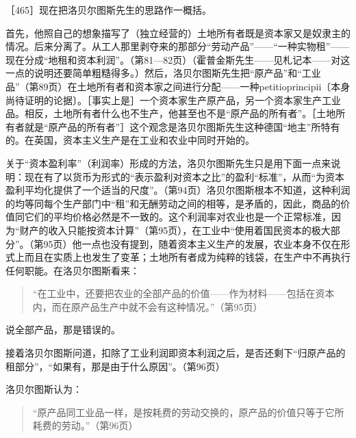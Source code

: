 
［465］现在把洛贝尔图斯先生的思路作一概括。

首先，他照自己的想象描写了（独立经营的）土地所有者既是资本家又是奴隶主的情况。后来分离了。从工人那里剥夺来的那部分“劳动产品”——“一种实物租”——现在分成“地租和资本利润”。（第81—82页）（霍普金斯先生——见札记本——对这一点的说明还要简单粗糙得多。）然后，洛贝尔图斯先生把“原产品”和“工业品”（第89页）在土地所有者和资本家之间进行分配——一种petitioprincipii〔本身尚待证明的论据〕。［事实上是］一个资本家生产原产品，另一个资本家生产工业品。相反，土地所有者什么也不生产，他甚至也不是“原产品的所有者”。［土地所有者就是“原产品的所有者”］这个观念是洛贝尔图斯先生这种德国“地主”所特有的。在英国，资本主义生产是在工业和农业中同时开始的。

关于“资本盈利率”（利润率）形成的方法，洛贝尔图斯先生只是用下面一点来说明：现在有了以货币为形式的“表示盈利对资本之比”的盈利“标准”，从而“为资本盈利平均化提供了一个适当的尺度”。（第94页）洛贝尔图斯根本不知道，这种利润的均等同每个生产部门中“租”和无酬劳动之间的相等，是矛盾的，因此，商品的价值同它们的平均价格必然是不一致的。这个利润率对农业也是一个正常标准，因为“财产的收入只能按资本计算”（第95页），在工业中“使用着国民资本的极大部分”。（第95页）他一点也没有提到，随着资本主义生产的发展，农业本身不仅在形式上而且在实质上也发生了变革；土地所有者成为纯粹的钱袋，在生产中不再执行任何职能。在洛贝尔图斯看来：

\begin{quote}{“在工业中，还要把农业的全部产品的价值——作为材料——包括在资本内，而在原产品生产中就不会有这种情况。”（第95页）}\end{quote}

说全部产品，那是错误的。

接着洛贝尔图斯问道，扣除了工业利润即资本利润之后，是否还剩下“归原产品的租部分”，“如果有，那是由于什么原因”。（第96页）

洛贝尔图斯认为：

\begin{quote}{“原产品同工业品一样，是按耗费的劳动交换的，原产品的价值只等于它所耗费的劳动。”（第96页）}\end{quote}

